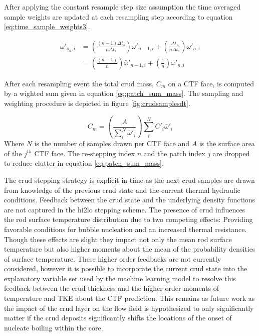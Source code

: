 After applying the constant resample step size assumption the time averaged sample weights are updated at each resampling step according to equation \ref{eq:time_sample_weights3}.

\begin{align}
\bar \omega'_{{s_n},i} &= \left( \frac{(n-1) \Delta t_s}{n \Delta t_s} \right) \bar \omega'_{n-1,i} + \left( \frac{\Delta t_s}{n \Delta t_s} \right) \omega'_{n,i} \nonumber \\
 &= \left( \frac{(n-1)}{n} \right) \bar \omega'_{n-1,i} + \left( \frac{1}{n} \right) \omega'_{n,i}
\label{eq:time_sample_weights3}
\end{align}

After each resampling event the total crud mass, $C_m$ on a CTF face, is computed by a wighted sum given in equation \ref{eq:patch_sum_mass}.  The sampling and weighting procedure is depicted in figure \ref{fig:crudsamplesdt}.

\begin{equation}
C_{m} = \left(\frac{A}{\sum_i^N \bar \omega'_i}\right) \sum_i^N C'_i \bar \omega'_i
\label{eq:patch_sum_mass}
\end{equation}
Where $N$ is the number of samples drawn per CTF face and $A$ is the surface area of the $j^{th}$ CTF face.  The re-stepping index $n$ and the patch index $j$ are dropped to reduce clutter in equation \ref{eq:patch_sum_mass}.

The crud stepping strategy is explicit in time as the next crud samples are drawn from knowledge of the previous crud state and the current thermal hydraulic conditions.  Feedback between the crud state and the underlying density functions are not captured in the hi2lo stepping scheme.  The presence of crud influences the rod surface temperature distribution due to two competing effects: Providing favorable conditions for bubble nucleation and an increased thermal resistance.  Though these effects are slight they impact not only the mean rod surface temperature but also higher moments about the mean of the probability densities of surface temperature.  These higher order feedbacks are not currently considered, however it is possible to incorporate the current crud state into the explanatory variable set used by the machine learning model to resolve this feedback between the crud thickness and the higher order moments of temperature and TKE about the CTF prediction.  This remains as future work as the impact of the crud layer on the flow field is hypothesized to only significantly matter if the crud deposits significantly shifts the locations of the onset of nucleate boiling within the core.

